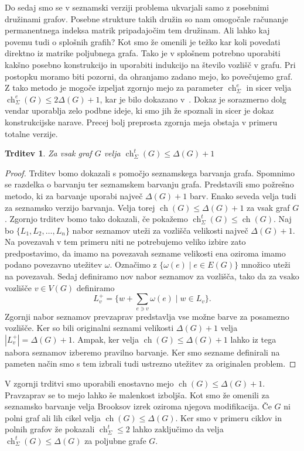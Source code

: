 \documentclass[12pt,a4paper,twoside]{article}
\theoremstyle{definition} %
\theoremstyle{plain} %
\newtheorem{trditev}[definicija]{Trditev}
\numberwithin{equation}{section}  %
\DeclareMathOperator{\ch}{ch}
\begin{document}
Do sedaj smo se v seznamski verziji problema ukvarjali samo z posebnimi družinami grafov. Posebne strukture takih družin so nam omogočale računanje permanentnega indeksa matrik pripadajočim tem družinam. Ali lahko kaj povemu tudi o splošnih grafih? Kot smo že omenili je težko kar koli povedati direktno iz matrike poljubnega grafa. Tako je v splošnem potrebno uporabiti kakšno posebno konstrukcijo in uporabiti indukcijo na število vozlišč v grafu. Pri postopku moramo biti pozorni, da ohranjamo zadano mejo, ko povečujemo graf. Z tako metodo je mogoče izpeljat zgornjo mejo za parameter $\ch_{\Sigma}^e$ in sicer velja $\ch_{\Sigma}^e(G) \le 2 \Delta(G) + 1$, kar je bilo dokazano v~\cite{listbounds}. Dokaz je sorazmerno dolg vendar uporablja zelo podbne ideje, ki smo jih že spoznali in sicer je dokaz konstrukcijske narave. Precej bolj preprosta zgornja meja obstaja v primeru totalne verzije.
\begin{trditev}
\label{list_t_gen}
Za vsak graf $G$ velja $\ch_{\Sigma}^t(G) \le  \Delta(G) + 1$
\end{trditev}
\begin{proof}
Trditev bomo dokazali s pomočjo seznamskega barvanja grafa. Spomnimo se razdelka o barvanju ter seznamskem barvanju grafa. Predstavili smo požrešno metodo, ki za barvanje uporabi največ $\Delta(G) + 1$ barv. Enako seveda velja tudi za seznamsko verzijo barvanja. Velja torej $\ch(G) \le \Delta(G) +1$ za vsak graf $G$. Zgornjo trditev bomo tako dokazali, če pokažemo $\ch_{\Sigma}^t(G) \le \ch(G)$.
Naj bo $\{L_1, L_2, \ldots, L_n\}$ nabor seznamov uteži za vozlišča velikosti največ $\Delta(G) + 1$. Na povezavah v tem primeru niti ne potrebujemo veliko izbire zato predpostavimo, da imamo na povezavah sezname velikosti ena oziroma imamo podano povezavno utežitev $\omega$. Označimo z $\{\omega(e) \mid e \in E(G)\}$ množico uteži na povezavah. Sedaj definiramo nov nabor seznamov za vozlišča, tako da za vsako vozlišče $v \in V(G)$ definiramo
$$L_{v}^+ = \{ w + \sum_{e\ni v} \omega(e) \mid w \in L_v\}. $$
Zgornji nabor seznamov prevzaprav predstavlja vse možne barve za posamezno vozlišče. Ker so bili originalni seznami velikosti $\Delta(G) + 1$ velja $|L_{v}^+| =\Delta(G) + 1$. Ampak, ker velja $\ch(G) \le \Delta(G) +1$ lahko iz tega nabora seznamov izberemo pravilno barvanje. Ker smo sezname definirali na pameten način smo s tem izbrali tudi ustrezno utežitev za originalen problem.
\end{proof}
V zgornji trditvi smo uporabili enostavno mejo $\ch(G) \le \Delta(G) + 1$. Pravzaprav se to mejo lahko še malenkost izboljša. Kot smo že omenili za seznamsko barvanje velja Brooksov izrek oziroma njegova modifikacija. Če $G$ ni polni graf ali lih cikel velja $\ch(G) \le \Delta(G)$. Ker smo v primeru ciklov in polnih grafov že pokazali $\ch_{\Sigma}^t \le 2$ lahko zaključimo da velja $\ch_{\Sigma}^t(G) \le \Delta(G)$ za poljubne grafe $G$.
\end{document}
